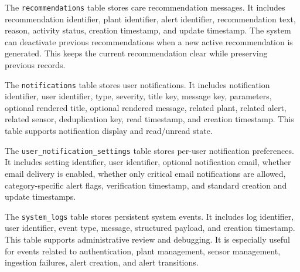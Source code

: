 The \texttt{recommendations} table stores care recommendation messages. It includes recommendation identifier, plant identifier, alert identifier, recommendation text, reason, activity status, creation timestamp, and update timestamp. The system can deactivate previous recommendations when a new active recommendation is generated. This keeps the current recommendation clear while preserving previous records.

The \texttt{notifications} table stores user notifications. It includes notification identifier, user identifier, type, severity, title key, message key, parameters, optional rendered title, optional rendered message, related plant, related alert, related sensor, deduplication key, read timestamp, and creation timestamp. This table supports notification display and read/unread state.

The \texttt{user\_notification\_settings} table stores per-user notification preferences. It includes setting identifier, user identifier, optional notification email, whether email delivery is enabled, whether only critical email notifications are allowed, category-specific alert flags, verification timestamp, and standard creation and update timestamps.

The \texttt{system\_logs} table stores persistent system events. It includes log identifier, user identifier, event type, message, structured payload, and creation timestamp. This table supports administrative review and debugging. It is especially useful for events related to authentication, plant management, sensor management, ingestion failures, alert creation, and alert transitions.

